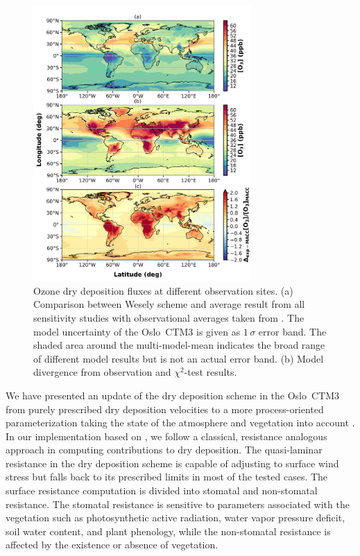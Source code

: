 \documentclass[gmd, manuscript]{copernicus}
\begin{document}
%
\begin{figure}[t]
  \includegraphics[width=8.3cm]{fig08}
  \caption{Ozone dry deposition fluxes at different observation sites. (a) Comparison between Wesely scheme and average result from all sensitivity studies with observational averages taken from \citet{ACP:Hardacre2015}. The model uncertainty of the Oslo~CTM3 is given as $1\,\sigma$ error band. The shaded area around the multi-model-mean indicates the broad range of different model results but is not an actual error band. (b) Model divergence from observation and $\chi^2$-test results.}
  \label{fig:mmm_drydep_stations}
\end{figure}

\label{sec:conc}
We have presented an update of the dry deposition scheme in the Oslo~CTM3 from purely prescribed dry deposition velocities \citep{AE:Wesely1989,JGR:Hough1991} to a more process-oriented parameterization taking the state of the atmosphere and vegetation into account \citep{ACP:Simpson2012}. In our implementation based on \citet{ACP:Simpson2012}, we follow a classical, resistance analogous approach in computing contributions to dry deposition. The quasi-laminar resistance in the dry deposition scheme is capable of adjusting to surface wind stress but falls back to its prescribed limits in most of the tested cases. The surface resistance computation is divided into stomatal and non-stomatal resistance. The stomatal resistance is sensitive to parameters associated with the vegetation such as photosynthetic active radiation, water vapor pressure deficit, soil water content, and plant phenology, while the non-stomatal resistance is affected by the existence or absence of vegetation.
\end{document}
